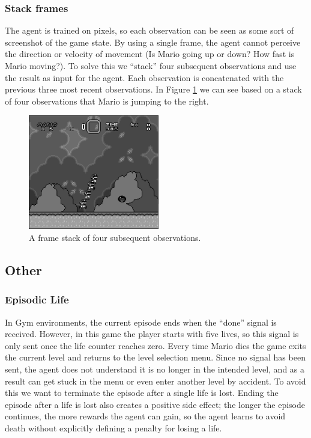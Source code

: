\documentclass[a4paper]{article}
\begin{document}
\subsubsection{Stack frames}
The agent is trained on pixels, so each observation can be seen as some sort of screenshot of the game state.
By using a single frame, the agent cannot perceive the direction or velocity of movement (Is Mario going up or down? How fast is Mario moving?).
To solve this we ``stack'' four subsequent observations and use the result as input for the agent.
Each observation is concatenated with the previous three most recent observations.
In Figure \ref{fig:stack} we can see based on a stack of four observations that Mario is jumping to the right.
\begin{figure}[htbp]
    \centering
    \includegraphics[height=5cm]{stacked}
    \caption{A frame stack of four subsequent observations.}
    \label{fig:stack}
\end{figure}

\subsection{Other}
\subsubsection{Episodic Life}
In Gym environments, the current episode ends when the ``done'' signal is received.
However, in this game the player starts with five lives, so this signal is only sent once the life counter reaches zero.
Every time Mario dies the game exits the current level and returns to the level selection menu.
Since no signal has been sent, the agent does not understand it is no longer in the intended level, and as a result can get stuck in the menu or even enter another level by accident.
To avoid this we want to terminate the episode after a single life is lost.
Ending the episode after a life is lost also creates a positive side effect; the longer the episode continues, the more rewards the agent can gain, so the agent learns to avoid death without explicitly defining a penalty for losing a life.
\end{document}
